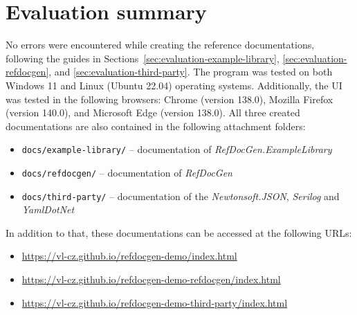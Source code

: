 \section*{Evaluation summary}
No errors were encountered while creating the reference documentations, following the guides in Sections~\ref{sec:evaluation-example-library}, \ref{sec:evaluation-refdocgen}, and \ref{sec:evaluation-third-party}.
The program was tested on both Windows 11 and Linux (Ubuntu 22.04) operating systems.
Additionally, the UI was tested in the following browsers: Chrome (version 138.0), Mozilla Firefox (version 140.0), and Microsoft Edge (version 138.0).
All three created documentations are also contained in the following attachment folders:

\begin{itemize}
    \item \texttt{docs/example-library/} -- documentation of \textit{RefDocGen.ExampleLibrary}
    \item \texttt{docs/refdocgen/} -- documentation of \textit{RefDocGen}
    \item \texttt{docs/third-party/} -- documentation of the \textit{Newtonsoft.JSON}, \textit{Serilog} and \textit{YamlDotNet}
\end{itemize}

In addition to that, these documentations can be accessed at the following URLs:

\begin{itemize}
    \item \url{https://vl-cz.github.io/refdocgen-demo/index.html}
    \item \url{https://vl-cz.github.io/refdocgen-demo-refdocgen/index.html}
    \item \url{https://vl-cz.github.io/refdocgen-demo-third-party/index.html}
\end{itemize}
